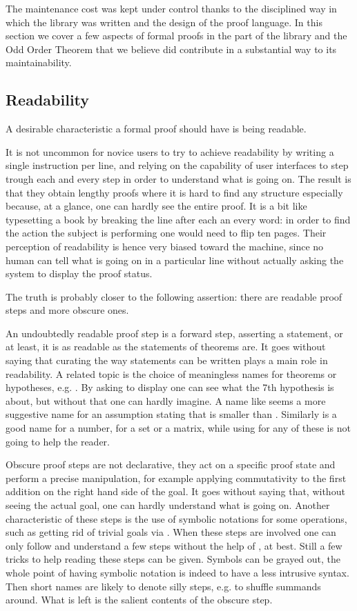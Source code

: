 The maintenance cost was kept under control thanks to the disciplined way
in which the library was written and the design of the \mcbSSR{} proof
language.  In this section we cover a few aspects of formal proofs in the 
part of the \mcbMC{} library and the Odd Order Theorem that we believe
did contribute in a substantial way to its maintainability.

\subsection{Readability}

A desirable characteristic a formal proof should have is being
readable.

It is not uncommon for novice users to try to achieve readability by
writing a single instruction per line, and relying on the capability
of user interfaces to step trough each and every step in order to
understand what is going on.  The result is that they obtain lengthy
proofs where it is hard to find any structure especially because, at a
glance, one can hardly see the entire proof.  It is a bit like
typesetting a book by breaking the line after each an every word: in
order to find the action the subject is performing one would need to
flip ten pages.  Their perception of readability is hence very biased
toward the machine, since no human can tell what is going on in a
particular line without actually asking the system to display the
proof status.

The truth is probably closer to the following assertion:
there are readable proof steps and more obscure ones. 

An undoubtedly readable proof step is a forward step, asserting
a statement, or at least, it is as readable as the statements of
theorems are. It goes without saying that curating the way statements
can be written plays a main role in readability.
A related topic is the choice of meaningless names for theorems or
hypotheses, e.g. . By asking \Coq{} to display one can see
what the 7th hypothesis is about, but without that one can hardly
imagine. A name like  seems a more suggestive name for an
assumption stating that  is smaller than .
Similarly  is a good name for a number,  for a set or a
matrix, while using  for any of these is not going to help
the reader.

Obscure proof steps are not declarative, they act on a specific proof
state and perform a precise manipulation, for example applying
commutativity to the first addition on the right hand side of the
goal. It goes without saying that, without seeing the actual goal, one
can hardly understand what is going on.
Another characteristic of these steps is the use of symbolic
notations for some operations, such as getting rid of trivial goals
via \C{//}. When these steps are involved one can only follow and understand
a few steps without the help of \Coq{}, at best.  
Still a few tricks to help reading these steps can be given. Symbols
can be grayed out, the whole point of having symbolic notation is
indeed to have a less intrusive syntax.  Then short names are likely
to denote silly steps, e.g.  to shuffle summands around.
What is left is the salient contents of the obscure step.

